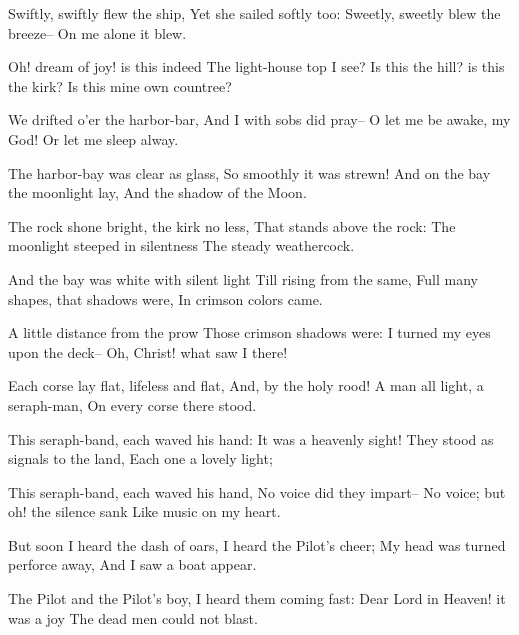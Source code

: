 \documentclass{book}
\begin{document}
  Swiftly, swiftly flew the ship,                                    
  Yet she sailed softly too:
  Sweetly, sweetly blew the breeze--
  On me alone it blew.

%
  Oh! dream of joy! is this indeed
  The light-house top I see?                                         
  Is this the hill? is this the kirk?
  Is this mine own countree?

  We drifted o'er the harbor-bar,
  And I with sobs did pray--
  O let me be awake, my God!                                         
  Or let me sleep alway.

  The harbor-bay was clear as glass,
  So smoothly it was strewn!
  And on the bay the moonlight lay,
  And the shadow of the Moon.                                        

  The rock shone bright, the kirk no less,
  That stands above the rock:
  The moonlight steeped in silentness
  The steady weathercock.

  And the bay was white with silent light                            
  Till rising from the same,
  Full many shapes, that shadows were,
  In crimson colors came.

%
  A little distance from the prow
  Those crimson shadows were:                                        
  I turned my eyes upon the deck--
  Oh, Christ! what saw I there!

  Each corse lay flat, lifeless and flat,
  And, by the holy rood!
  A man all light, a seraph-man,                                     
  On every corse there stood.

  This seraph-band, each waved his hand:
  It was a heavenly sight!
  They stood as signals to the land,
  Each one a lovely light;                                           

  This seraph-band, each waved his hand,
  No voice did they impart--
  No voice; but oh! the silence sank
  Like music on my heart.

  But soon I heard the dash of oars,                                 
  I heard the Pilot's cheer;
  My head was turned perforce away,
  And I saw a boat appear.

  The Pilot and the Pilot's boy,
  I heard them coming fast:                                          
  Dear Lord in Heaven! it was a joy
  The dead men could not blast.
\end{document}
